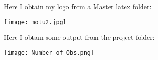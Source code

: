 \documentclass[hyperref={pdfstartview={XYZ null null 1.3}}]{beamer}
\begin{document}
\begin{frame}
Here I obtain my logo from a Master latex folder:
\begin{center}
\texttt{[image: motu2.jpg]}
\end{center}
\end{frame}

\begin{frame}
Here I obtain some output from the project folder:
\begin{center}
\texttt{[image: Number of Obs.png]}
\end{center}
\end{frame}
\end{document}
